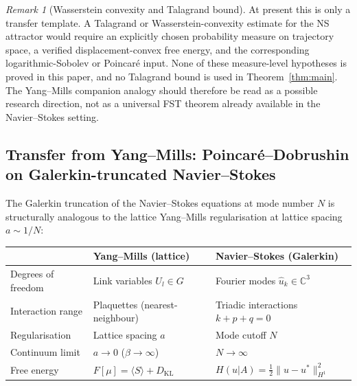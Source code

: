 \documentclass[12pt,a4paper]{article}
\theoremstyle{definition}
\theoremstyle{plain}
\theoremstyle{remark}
\newtheorem{remark}[definition]{Remark}
\begin{document}
\begin{remark}[Wasserstein convexity and Talagrand bound]
\label{rem:talagrand}
At present this is only a transfer template.  A Talagrand or Wasserstein-convexity estimate for the NS attractor would require an explicitly chosen probability measure on trajectory space, a verified displacement-convex free energy, and the corresponding logarithmic-Sobolev or Poincar\'e input.  None of these measure-level hypotheses is proved in this paper, and no Talagrand bound is used in Theorem~\ref{thm:main}.  The Yang--Mills companion analogy should therefore be read as a possible research direction, not as a universal FST theorem already available in the Navier--Stokes setting.
\end{remark}

\subsection{\texorpdfstring{Transfer from Yang--Mills: Poincar\'e--Dobrushin on Galerkin-truncated Navier--Stokes}{Transfer from Yang-Mills: Poincare-Dobrushin on Galerkin-truncated Navier-Stokes}}
\label{sec:ym-ns-transfer}

The Galerkin truncation of the Navier--Stokes equations at mode number $N$ is structurally analogous to the lattice Yang--Mills regularisation at lattice spacing $a \sim 1/N$:

\begin{center}
\begin{tabularx}{\textwidth}{Y|Y|Y}
& \textbf{Yang--Mills (lattice)} & \textbf{Navier--Stokes (Galerkin)} \\
\hline
Degrees of freedom & Link variables $U_l \in G$ & Fourier modes $\hat{u}_k \in \mathbb{C}^3$ \\
Interaction range & Plaquettes (nearest-neighbour) & Triadic interactions $k + p + q = 0$ \\
Regularisation & Lattice spacing $a$ & Mode cutoff $N$ \\
Continuum limit & $a \to 0$ ($\beta \to \infty$) & $N \to \infty$ \\
Free energy & $F[\mu] = \langle S \rangle + D_{\mathrm{KL}}$ & $H(u|A) = \frac{1}{2}\|u - u^*\|_{H^1}^2$ \\
\end{tabularx}
\end{center}
\end{document}
